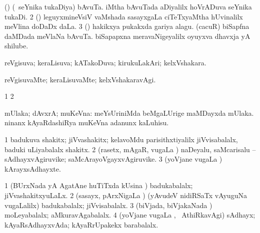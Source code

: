\bentry
{} 
\gl{\nA}
\bmng
\bnum
{} (\roVca) 
\banum
{} (\kanmu\ seYnika tukaDiya) bAvuTa. 
 iMtha bAvuTada aDiyalilx hoVrADuva seYnika tukaDi. 
\eanum
\numie
\num{2} (\savi) leguyxmineVsiV vaMshada sasayxgaLa ciTeTxyaMtha hUvinalilx meVlina doDaDx daLa. 
\num{3} (\pArxvi) hakikxya pukakxda gariya alagu. 
\banum
{} (cacuR) biSapfna daMDada meVlaNa bAvuTa. 
 biSapapxna meravaNigeyalilx oyuyxva dhavxja yA shilube. 
\eanum
\numie
\enum
\emng
\eentry

\bentry
{} 
\gl{\gu}
\expl{}
\bmng
 reVgisuva; keraLisuva; kATakoDuva; kirukuLakAri; kelxVshakara. 
\emng
\eentry

\bentry
{} 
\gl{\kirxvi}
\expl{}
\bmng
 reVgisuvaMte; keraLisuvaMte; kelxVshakaravAgi. 
\emng
\eentry

\bentry
{}
\gl{\saMkiSx}
\expl{}
\bmng
\bnum
\num{1}  
\num{2}  
\enum
\emng
\eentry

\bentry
{}
\gl{\saMkiSx}
\expl{}
\bmng
\emng
\eentry

\bentry
{}
\gl{\saMkiSx}
\expl{}
\bmng
\emng
\eentry

\bentry
{} 
\gl{\upa}
\expl{}
\bmng
 mUlaka; dAvxrA; muKeVna:  meYsUriniMda beMgaLUrige maMDayxda mUlaka.  ninanx kAyaRdashiRya muKeVna adanunx kaLuhisu. 
\emng
\eentry

\bentry
{} 
\gl{\nA}
\expl{}
\bmng
\bnum
\num{1} badukuva shakitx; jiVvashakitx; kelavoMdu parisithxtiyalilx jiVvisabalalx, baduki uLiyabalalx shakitx. 
\num{2} (rasetx, mAgaR, \mo vugaLa \vi) naDeyalu, saMcarisalu -- sAdhayxvAgiruvike; saMcArayoVgayxvAgiruvike. 
\num{3} (yoVjane \mo vugaLa \vi) kArayxsAdhayxte. 
\enum
\emng
\eentry

\bentry
{} 
\gl{\gu}
\expl{}
\bmng
\bnum
\num{1} (BUrxNada yA AgatAne huTiTxda kUsina \vi) badukabalalx; jiVvashakitxyuLaLx. 
\num{2} (sasayx, pArxNigaLa \vi) (yAvudeV nidiRSaTx vAyuguNa \mo vugaLalilx) badukabalalx; jiVvisabalalx. 
\num{3} (biVjada, biVjakaNada \vi) moLeyabalalx; aMkuravAgabalalx. 
\num{4} (yoVjane \mo vugaLa \vi, \kanmu\ AthiRkavAgi) sAdhayx; kAyaRsAdhayxvAda; kAyaRrUpakekx barabalalx. 
\enum
\emng
\eentry

